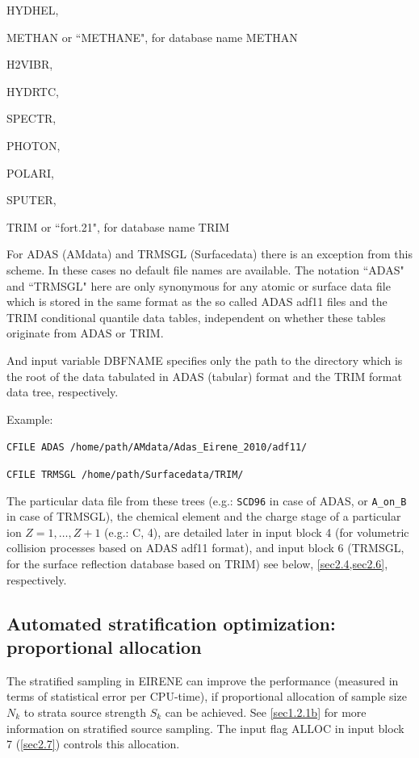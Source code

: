 HYDHEL, 

METHAN or ``METHANE", for database name METHAN 

H2VIBR, 

HYDRTC, 

SPECTR, 

PHOTON, 

POLARI, 

SPUTER, 

TRIM or ``fort.21",  for database name TRIM 

For ADAS (AMdata) and TRMSGL (Surfacedata) there is an exception from this
scheme.
In these cases no default file names are available.
The notation ``ADAS" and ``TRMSGL" here are only synonymous for any atomic or
surface data file which is stored in the same format as the so called \ac{ADAS}
adf11 files and the TRIM conditional quantile data tables, independent on
whether these tables originate from \ac{ADAS} or TRIM.

And input variable DBFNAME specifies only the path to the directory which is
the root of the data tabulated in \ac{ADAS} (tabular) format and the TRIM
format data tree, respectively.

Example:

\lstinline|CFILE ADAS /home/path/AMdata/Adas_Eirene_2010/adf11/|

\lstinline|CFILE TRMSGL /home/path/Surfacedata/TRIM/|

The particular data file from these trees (e.g.: \lstinline|SCD96| in case
of \ac{ADAS}, or \lstinline|A_on_B| in case of TRMSGL), the chemical
element  and the charge stage of a particular ion $Z = 1, \dots, Z+1$ (e.g.: C,
4), are detailed later in input block 4 (for volumetric collision processes
based on \ac{ADAS} adf11 format), and input block 6 (TRMSGL, for the surface
reflection database based on TRIM) see below, \cref{sec2.4,sec2.6},
respectively.

\subsection{Automated stratification optimization: proportional allocation}\label{NFILEK}

The stratified sampling in EIRENE can improve the performance (measured in
terms of statistical error per CPU-time), if proportional allocation of sample
size $N_k$ to strata source strength $S_k$ can be achieved.
See \cref{sec1.2.1b} for more information on stratified source sampling.
The input flag ALLOC in input block 7 (\cref{sec2.7}) controls this allocation.

